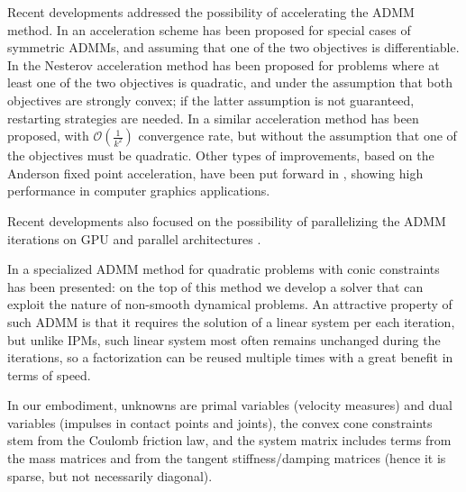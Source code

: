 \documentclass[final,3p]{elsarticle}
\begin{document}
Recent developments addressed the possibility of accelerating the ADMM method.
In 
 \cite{Goldfarb2013} %
an acceleration scheme has been proposed for special cases of symmetric ADMMs, and assuming that one of the two objectives is differentiable.
%
In 
 \cite{Goldstein2014} %
the Nesterov acceleration method has been proposed for problems where at least one of the two objectives is quadratic, and under the assumption that both objectives are strongly convex; if the latter assumption is not guaranteed, restarting strategies are needed. 
%
In 
 \cite{Kadkhodaie2015} %
a similar acceleration method has been proposed, with $\mathcal{O}(\frac{1}{k^2})$ convergence rate, but without the assumption that one of the objectives must be quadratic.
%
Other types of improvements, based on the Anderson fixed point acceleration, have been put forward in 
 \cite{Zhang2019} %
 \cite{Ouyang2020} %
, showing high performance in computer graphics applications.

Recent developments also focused on the possibility of parallelizing the ADMM iterations on GPU and parallel architectures
\cite{Schubiger2020} %
.

In
\cite{Stellato2020} %
a specialized ADMM method for quadratic problems with conic constraints has been presented: on the top of this method we develop a solver that can exploit the nature of non-smooth dynamical problems. An attractive property of such ADMM is that it requires the solution of a linear system per each iteration, but unlike IPMs, such linear system most often remains unchanged during the iterations, so a factorization can be reused multiple times with a great benefit in terms of speed.

In our embodiment, unknowns are primal variables (velocity measures) and dual variables (impulses in contact points and joints), the convex cone constraints stem from the Coulomb friction law, and the system matrix includes terms from the mass matrices and from the tangent stiffness/damping matrices (hence it is sparse, but not necessarily diagonal).
\end{document}
